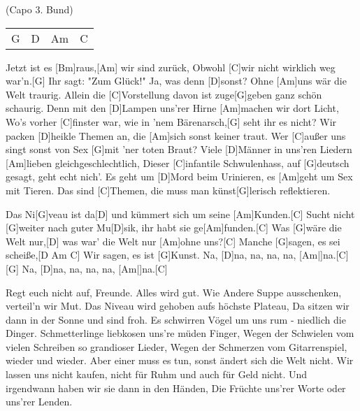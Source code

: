
{\footnotesize(Capo 3. Bund)}

\begin{guitar}
	{\footnotesize\begin{tabular}{l|l|l|l}
		G	& D	& Am	& C
	\end{tabular}}
	
	Jetzt ist es [Bm]raus,[Am] wir sind zurück,
	Obwohl [C]wir nicht wirklich weg war'n.[G] Ihr sagt: "Zum Glück!"
	Ja, was denn [D]sonst? Ohne [Am]uns wär die Welt traurig.
	Allein die [C]Vorstellung davon ist zuge[G]geben ganz schön schaurig.
	Denn mit den [D]Lampen uns'rer Hirne [Am]machen wir dort Licht,
	Wo's vorher [C]finster war, wie in 'nem Bärenarsch,[G] seht ihr es nicht?
	Wir packen [D]heikle Themen an, die [Am]sich sonst keiner traut.
	Wer [C]außer uns singt sonst von Sex [G]mit 'ner toten Braut?
	Viele [D]Männer in uns'ren Liedern [Am]lieben gleichgeschlechtlich,
	Dieser [C]infantile Schwulenhass, auf [G]deutsch gesagt, geht echt nich'.
	Es geht um [D]Mord beim Urinieren, es [Am]geht um Sex mit Tieren.
	Das sind [C]Themen, die muss man künst[G]lerisch reflektieren.
	
	Das Ni[G]veau ist da[D] und kümmert sich um seine [Am]Kunden.[C]{}
	Sucht nicht [G]weiter nach guter Mu[D]sik, ihr habt sie ge[Am]funden.[C]{}
	Was [G]wäre die Welt nur,[D] was war' die Welt nur [Am]ohne uns?[C]{}
	Manche [G]sagen, es sei scheiße,[D Am C]{}
	Wir sagen, es ist [G]Kunst. Na, [D]na, na, na, na, [Am|]{na.}[C]{}
	[G] Na, [D]na, na, na, na, [Am|]{na.}[C]{}
	
	\pagebreak
	
	Regt euch nicht auf, Freunde. Alles wird gut.
	Wie Andere Suppe ausschenken, verteil'n wir Mut.
	Das Niveau wird gehoben aufs höchste Plateau,
	Da sitzen wir dann in der Sonne und sind froh.
	Es schwirren Vögel um uns rum - niedlich die Dinger.
	Schmetterlinge liebkosen uns're müden Finger,
	Wegen der Schwielen vom vielen Schreiben so grandioser Lieder,
	Wegen der Schmerzen vom Gitarrenspiel, wieder und wieder.
	Aber einer muss es tun, sonst ändert sich die Welt nicht.
	Wir lassen uns nicht kaufen, nicht für Ruhm und auch für Geld nicht.
	Und irgendwann haben wir sie dann in den Händen,
	Die Früchte uns'rer Worte oder uns'rer Lenden.
	
	 
\end{guitar}